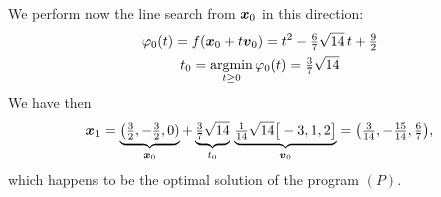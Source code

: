 \begin{example}
We perform now the line search from $\boldsymbol{x}_0$ in this direction:
\begin{gather*}
\varphi_0(t) = f(\boldsymbol{x}_0 + t\boldsymbol{v}_0) = t^2 - \tfrac{6}{7} \sqrt{14} \, t + \tfrac{9}{2} \\
t_0 = \operatorname*{argmin}_{t\geq 0} \varphi_0(t) = \tfrac{3}{7}\sqrt{14}
\end{gather*} 
We have then
\begin{equation*}
\boldsymbol{x}_1 = \underbrace{\big( \tfrac{3}{2}, -\tfrac{3}{2}, 0)}_{\boldsymbol{x}_0} + \underbrace{\tfrac{3}{7}\sqrt{14}}_{t_0} \, \underbrace{ \tfrac{1}{14}\sqrt{14} \big[ -3, 1,  2  \big]}_{\boldsymbol{v}_0} = \big( \tfrac{3}{14}, -\tfrac{15}{14}, \tfrac{6}{7} \big),
\end{equation*}
which happens to be the optimal solution of the program $(P)$.
\end{example}

